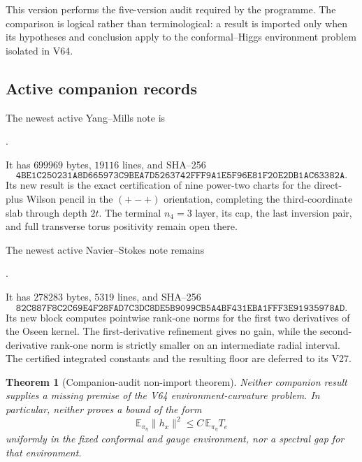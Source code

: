 \documentclass[11pt]{article}
\newtheorem{theorem}{Theorem}[section]
\theoremstyle{remark}
\begin{document}
This version performs the five-version audit required by the programme.
The comparison is logical rather than terminological: a result is imported
only when its hypotheses and conclusion apply to the conformal--Higgs
environment problem isolated in V64.

\subsection{Active companion records}

The newest active Yang--Mills note is
\begin{center}\small
{}.
\end{center}
It has \(699969\) bytes, \(19116\) lines, and SHA--256
\[
 \texttt{4BE1C250231A8D665973C9BEA7D5263742FFF9A1E5F96E81F20E2DB1AC63382A}.
                                                               \tag{65.1}
\]
Its new result is the exact certification of nine power-two charts for
the direct-plus Wilson pencil in the \((+-+)\) orientation, completing
the third-coordinate slab through depth \(2t\).  The terminal
\(n_4=3\) layer, its cap, the last inversion pair, and full transverse
torus positivity remain open there.

The newest active Navier--Stokes note remains
\begin{center}\small
{}.
\end{center}
It has \(278283\) bytes, \(5319\) lines, and SHA--256
\[
 \texttt{82C887F8C2C69E4F28FAD7C3DC8DE5B9099CB5A4BF431EBA1FFF3E91935978AD}.
                                                               \tag{65.2}
\]
Its new block computes pointwise rank-one norms for the first two
derivatives of the Oseen kernel.  The first-derivative refinement gives
no gain, while the second-derivative rank-one norm is strictly smaller
on an intermediate radial interval.  The certified integrated constants
and the resulting floor are deferred to its V27.

\begin{theorem}[Companion-audit non-import theorem]
\label{thm:v17v65-nonimport}
Neither companion result supplies a missing premise of the V64
environment-curvature problem.  In particular, neither proves a bound
of the form
\[
 \mathbb E_{\pi_\eta}\|h_x\|^2
 \leq C\,\mathbb E_{\pi_\eta}T_e                 \tag{65.3}
\]
uniformly in the fixed conformal and gauge environment, nor a spectral
gap for that environment.
\end{theorem}
\end{document}
